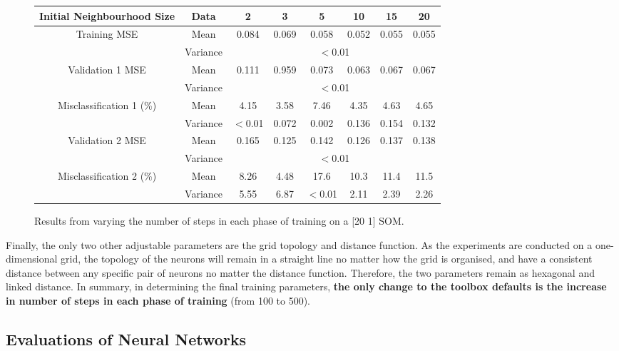 \documentclass[10pt, oneside]{article}
\begin{document}
\begin{figure}[h]
\begin{center}
\fontsize{9}{11}\selectfont
\begin{tabular}{|*{8}{c|}}
\hline 
Initial Neighbourhood Size & Data & 2 & 3 & 5 & 10 & 15 & 20 \\ \hline
\multirow{2}{*}{Training MSE} & Mean & 0.084 & 0.069 & 0.058 & 0.052 & 0.055 & 0.055 \\ \cline{2-8}
\ & Variance & \multicolumn{6}{c|}{$<$0.01} \\ \hline
\multirow{2}{*}{Validation 1 MSE} & Mean & 0.111 & 0.959 & 0.073 & 0.063 & 0.067 & 0.067 \\ \cline{2-8}
\ & Variance & \multicolumn{6}{c|}{$<$0.01} \\ \hline
\multirow{2}{*}{Misclassification 1 (\%)} & Mean & 4.15 & 3.58 & 7.46 & 4.35 & 4.63 & 4.65 \\ \cline{2-8}
\ & Variance & $<$0.01 & 0.072 & 0.002 & 0.136 & 0.154 & 0.132 \\ \hline
\multirow{2}{*}{Validation 2 MSE} & Mean & 0.165 & 0.125 & 0.142 & 0.126 & 0.137 & 0.138 \\ \cline{2-8}
\ & Variance & \multicolumn{6}{c|}{$<$0.01} \\ \hline
\multirow{2}{*}{Misclassification 2 (\%)} & Mean & 8.26 & 4.48 & 17.6 & 10.3 & 11.4 & 11.5 \\ \cline{2-8}
\ & Variance & 5.55 & 6.87 & $<$0.01 & 2.11 & 2.39 & 2.26 \\ \hline
\end{tabular}
\end{center}
\caption{\label{fig:neighbourhood-testing} Results from varying the number of steps in each phase of training on a [20 1] SOM.}
\end{figure}

Finally, the only two other adjustable parameters are the grid topology and distance function. As the experiments are conducted on a one-dimensional grid, the topology of the neurons will remain in a straight line no matter how the grid is organised, and have a consistent distance between any specific pair of neurons no matter the distance function. Therefore, the two parameters remain as hexagonal and linked distance. In summary, in determining the final training parameters, \textbf{the only change to the toolbox defaults is the increase in number of steps in each phase of training} (from 100 to 500).

\subsection{Evaluations of Neural Networks}
\end{document}
